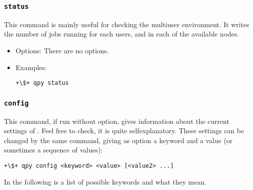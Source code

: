 \documentclass[a4paper,12pt]{article}
\begin{document}
\subsubsection{\texttt{status}}

This command is mainly useful for checking the multiuser environment.
It writes the number of jobs running for each users, and in each of the available nodes.

\begin{itemize}
\item Options:
  There are no options.
  
\item Examples:

  \begin{lstlisting}[style=BashStyle]
+\$+ qpy status
  \end{lstlisting}
\end{itemize}

\subsubsection{\texttt{config}}

This command, if run without option, gives information about the current settings of \qpy{}.
Feel free to check, it is quite selfexplanatory.
These settings can be changed by the same command, giving as option a keyword and a value (or sometimes a sequence of values):

\begin{lstlisting}[style=BashStyle]
+\$+ qpy config <keyword> <value> [<value2> ...]
\end{lstlisting}

In the following is a list of possible keywords and what they mean.
\end{document}
